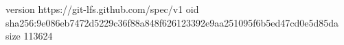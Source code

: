 version https://git-lfs.github.com/spec/v1
oid sha256:9e086eb7472d5229c36f88a848f626123392e9aa251095f6b5ed47cd0e5d85da
size 113624
